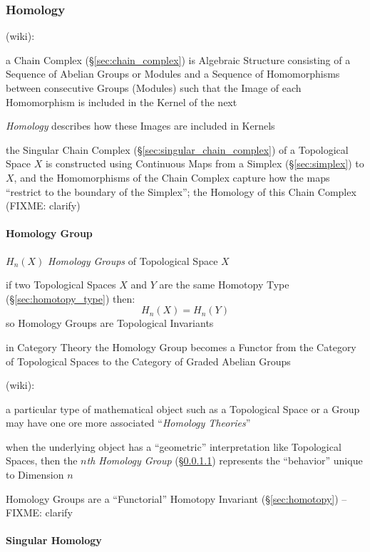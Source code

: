 \subsubsection{Homology}\label{sec:homology}

(wiki):

a Chain Complex (\S\ref{sec:chain_complex}) is Algebraic Structure consisting
of a Sequence of Abelian Groups or Modules and a Sequence of Homomorphisms
between consecutive Groups (Modules) such that the Image of each Homomorphism
is included in the Kernel of the next

\emph{Homology} describes how these Images are included in Kernels

the Singular Chain Complex (\S\ref{sec:singular_chain_complex}) of a
Topological Space $X$ is constructed using Continuous Maps from a Simplex
(\S\ref{sec:simplex}) to $X$, and the Homomorphisms of the Chain Complex
capture how the maps ``restrict to the boundary of the Simplex''; the Homology
of this Chain Complex (FIXME: clarify)



\paragraph{Homology Group}\label{sec:homology_group}\hfill

$H_n(X)$ \emph{Homology Groups} of Topological Space $X$

if two Topological Spaces $X$ and $Y$ are the same Homotopy Type
(\S\ref{sec:homotopy_type}) then:
\[
  H_n(X) = H_n(Y)
\]
so Homology Groups are Topological Invariants

in Category Theory the Homology Group becomes a Functor from the Category of
Topological Spaces to the Category of Graded Abelian Groups

(wiki):

a particular type of mathematical object such as a Topological Space or a
Group may have one ore more associated ``\emph{Homology Theories}''

when the underlying object has a ``geometric'' interpretation like Topological
Spaces, then the \emph{$n$th Homology Group} (\S\ref{sec:homology_group})
represents the ``behavior'' unique to Dimension $n$

Homology Groups are a ``Functorial'' Homotopy Invariant (\S\ref{sec:homotopy})
--FIXME: clarify



\paragraph{Singular Homology}\label{sec:singular_homology}\hfill

